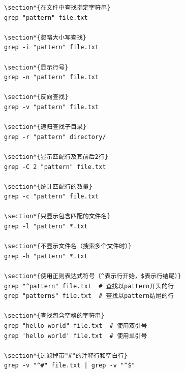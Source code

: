 \documentclass[12pt,UTF8]{ctexbook}
\begin{document}
\begin{verbatim}
\section*{在文件中查找指定字符串}
grep "pattern" file.txt

\section*{忽略大小写查找}
grep -i "pattern" file.txt

\section*{显示行号}
grep -n "pattern" file.txt

\section*{反向查找}
grep -v "pattern" file.txt

\section*{递归查找子目录}
grep -r "pattern" directory/

\section*{显示匹配行及其前后2行}
grep -C 2 "pattern" file.txt

\section*{统计匹配行的数量}
grep -c "pattern" file.txt

\section*{只显示包含匹配的文件名}
grep -l "pattern" *.txt

\section*{不显示文件名（搜索多个文件时）}
grep -h "pattern" *.txt

\section*{使用正则表达式符号（^表示行开始，$表示行结尾）}
grep "^pattern" file.txt  # 查找以pattern开头的行
grep "pattern$" file.txt  # 查找以pattern结尾的行

\section*{查找包含空格的字符串}
grep "hello world" file.txt  # 使用双引号
grep 'hello world' file.txt  # 使用单引号

\section*{过滤掉带"#"的注释行和空白行}
grep -v "^#" file.txt | grep -v "^$"
\end{verbatim}
\end{document}

